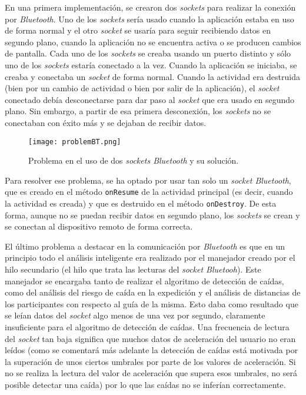 En una primera implementación, se crearon dos \textit{sockets} para realizar la conexión por \textit{Bluetooth}. Uno de los \textit{sockets} sería usado cuando la aplicación estaba en uso de forma normal y el otro \textit{socket} se usaría para seguir recibiendo datos en segundo plano, cuando la aplicación no se encuentra activa o se producen cambios de pantalla. Cada uno de los \textit{sockets} se creaba usando un puerto distinto y sólo uno de los \textit{sockets} estaría conectado a la vez. Cuando la aplicación se iniciaba, se creaba y conectaba un \textit{socket} de forma normal. Cuando la actividad era destruida (bien por un cambio de actividad o bien por salir de la aplicación), el \textit{socket} conectado debía desconectarse para dar paso al \textit{socket} que era usado en segundo plano. Sin embargo, a partir de esa primera desconexión, los \textit{sockets} no se conectaban con éxito más y se dejaban de recibir datos.

\begin{figure}[!h]
\begin{center}
\texttt{[image: problemBT.png]}
\caption{Problema en el uso de dos \textit{sockets Bluetooth} y su solución.}
\label{fig:problemBT}
\end{center}
\end{figure}

Para resolver ese problema, se ha optado por usar tan solo un \textit{socket Bluetooth}, que es creado en el método \texttt{onResume} de la actividad principal (es decir, cuando la actividad es creada) y que es destruido en el método \texttt{onDestroy}. De esta forma, aunque no se puedan recibir datos en segundo plano, los \textit{sockets} se crean y se conectan al dispositivo remoto de forma correcta.

El último problema a destacar en la comunicación por \textit{Bluetooth} es que en un principio todo el análisis inteligente era realizado por el manejador creado por el hilo secundario (el hilo que trata las lecturas del \textit{socket Bluetooh}). Este manejador se encargaba tanto de realizar el algoritmo de detección de caídas, como del análisis del riesgo de caída en la expedición y el análisis de distancias de los participantes con respecto al guía de la misma. Esto daba como resultado que se leían datos del \textit{socket} algo menos de una vez por segundo, claramente insuficiente para el algoritmo de detección de caídas. Una frecuencia de lectura del \textit{socket} tan baja significa que muchos datos de aceleración del usuario no eran leídos (como se comentará más adelante la detección de caídas está motivada por la superación de unos ciertos umbrales por parte de los valores de aceleración. Si no se realiza la lectura del valor de aceleración que supera esos umbrales, no será posible detectar una caída) por lo que las caídas no se inferían correctamente.

